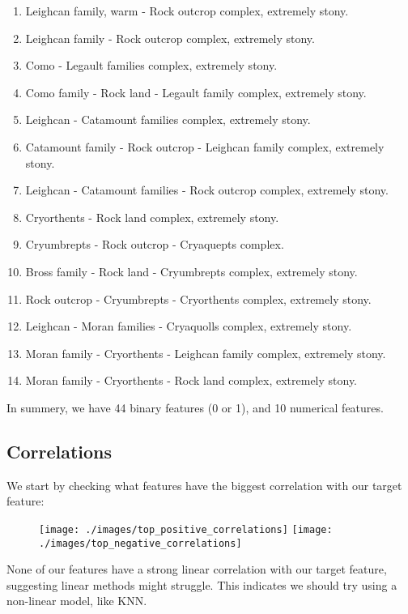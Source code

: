 \documentclass[11pt]{article}
\begin{document}
\begin{enumerate}
        \item Leighcan family, warm - Rock outcrop complex, extremely stony.
        \item Leighcan family - Rock outcrop complex, extremely stony.
        \item Como - Legault families complex, extremely stony.
        \item Como family - Rock land - Legault family complex, extremely stony.
        \item Leighcan - Catamount families complex, extremely stony.
        \item Catamount family - Rock outcrop - Leighcan family complex, extremely stony.
        \item Leighcan - Catamount families - Rock outcrop complex, extremely stony.
        \item Cryorthents - Rock land complex, extremely stony.
        \item Cryumbrepts - Rock outcrop - Cryaquepts complex.
        \item Bross family - Rock land - Cryumbrepts complex, extremely stony.
        \item Rock outcrop - Cryumbrepts - Cryorthents complex, extremely stony.
        \item Leighcan - Moran families - Cryaquolls complex, extremely stony.
        \item Moran family - Cryorthents - Leighcan family complex, extremely stony.
        \item Moran family - Cryorthents - Rock land complex, extremely stony.

    \end{enumerate}

    In summery, we have 44 binary features (0 or 1), and 10 numerical features.

    \subsection*{Correlations}
    We start by checking what features have the biggest correlation with our target feature:

    \begin{figure}[H]
        \texttt{[image: ./images/top\_positive\_correlations]}
        \texttt{[image: ./images/top\_negative\_correlations]}
    \end{figure}

    None of our features have a strong linear correlation with our target feature, suggesting linear methods might struggle.
    This indicates we should try using a non-linear model, like KNN.
    \newline
\end{document}

